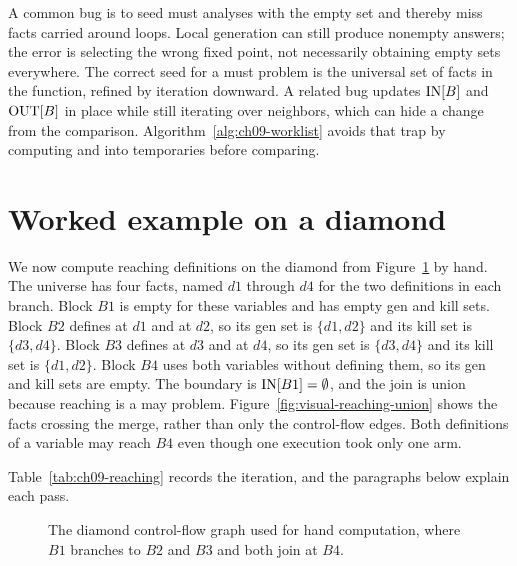 A common bug is to seed must analyses with the empty set and thereby miss facts carried around loops.
Local generation can still produce nonempty answers; the error is selecting the wrong fixed point, not necessarily obtaining empty sets everywhere.
The correct seed for a must problem is the universal set of facts in the function, refined by iteration downward.
A related bug updates $\mathrm{IN}[B]$ and $\mathrm{OUT}[B]$ in place while still iterating over neighbors, which can hide a change from the comparison.
Algorithm~\ref{alg:ch09-worklist} avoids that trap by computing  and  into temporaries before comparing.
\section{Worked example on a diamond}
\label{sec:ch09-worked}

We now compute reaching definitions on the diamond from Figure~\ref{fig:ch09-diamond} by hand.
The universe has four facts, named $d1$ through $d4$ for the two definitions in each branch.
Block $B1$ is empty for these variables and has empty gen and kill sets.
Block $B2$ defines  at $d1$ and  at $d2$, so its gen set is $\{d1, d2\}$ and its kill set is $\{d3, d4\}$.
Block $B3$ defines  at $d3$ and  at $d4$, so its gen set is $\{d3, d4\}$ and its kill set is $\{d1, d2\}$.
Block $B4$ uses both variables without defining them, so its gen and kill sets are empty.
The boundary is $\mathrm{IN}[B1] = \emptyset$, and the join is union because reaching is a may problem.
Figure~\ref{fig:visual-reaching-union} shows the facts crossing the merge, rather than only the control-flow edges.
Both definitions of a variable may reach $B4$ even though one execution took only one arm.



Table~\ref{tab:ch09-reaching} records the iteration, and the paragraphs below explain each pass.

\begin{figure}
\caption{The diamond control-flow graph used for hand computation, where $B1$ branches to $B2$ and $B3$ and both join at $B4$.}
\label{fig:ch09-diamond}
\end{figure}

